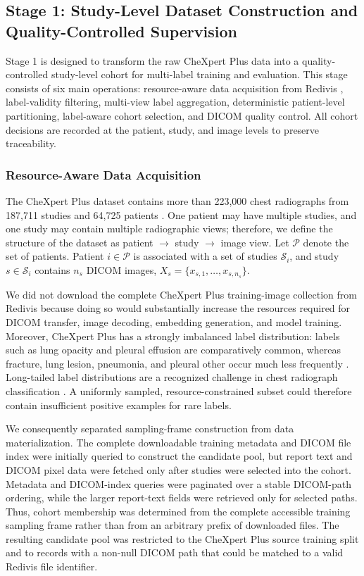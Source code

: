 \subsection{Stage 1: Study-Level Dataset Construction and Quality-Controlled Supervision}

Stage 1 is designed to transform the raw CheXpert Plus data into a quality-controlled study-level cohort for multi-label training and evaluation. This stage consists of six main operations: resource-aware data acquisition from Redivis \cite{redivischexpertplus}, label-validity filtering, multi-view label aggregation, deterministic patient-level partitioning, label-aware cohort selection, and DICOM quality control. All cohort decisions are recorded at the patient, study, and image levels to preserve traceability.

\subsubsection{Resource-Aware Data Acquisition}

The CheXpert Plus dataset contains more than 223,000 chest radiographs from 187,711 studies and 64,725 patients \cite{chambon2024chexpertplus}. One patient may have multiple studies, and one study may contain multiple radiographic views; therefore, we define the structure of the dataset as patient $\rightarrow$ study $\rightarrow$ image view. Let $\mathcal{P}$ denote the set of patients. Patient $i \in \mathcal{P}$ is associated with a set of studies $\mathcal{S}_i$, and study $s \in \mathcal{S}_i$ contains $n_s$ DICOM images, $X_s=\{x_{s,1},\ldots,x_{s,n_s}\}$.

We did not download the complete CheXpert Plus training-image collection from Redivis because doing so would substantially increase the resources required for DICOM transfer, image decoding, embedding generation, and model training. Moreover, CheXpert Plus has a strongly imbalanced label distribution: labels such as lung opacity and pleural effusion are comparatively common, whereas fracture, lung lesion, pneumonia, and pleural other occur much less frequently \cite{chambon2024chexpertplus}. Long-tailed label distributions are a recognized challenge in chest radiograph classification \cite{holste2022longtailed}. A uniformly sampled, resource-constrained subset could therefore contain insufficient positive examples for rare labels.

We consequently separated sampling-frame construction from data materialization. The complete downloadable training metadata and DICOM file index were initially queried to construct the candidate pool, but report text and DICOM pixel data were fetched only after studies were selected into the cohort. Metadata and DICOM-index queries were paginated over a stable DICOM-path ordering, while the larger report-text fields were retrieved only for selected paths. Thus, cohort membership was determined from the complete accessible training sampling frame rather than from an arbitrary prefix of downloaded files. The resulting candidate pool was restricted to the CheXpert Plus source training split and to records with a non-null DICOM path that could be matched to a valid Redivis file identifier.

